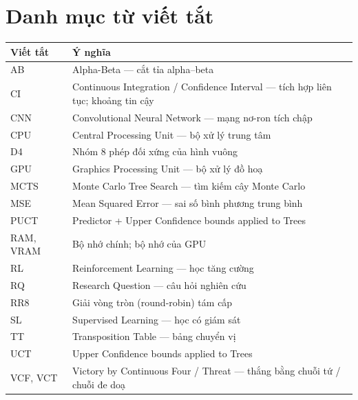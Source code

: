 \chapter*{Danh mục từ viết tắt}

\begin{table}[H]
  \centering
  \begin{tabularx}{\textwidth}{l X}
    \toprule
    \textbf{Viết tắt} & \textbf{Ý nghĩa} \\
    \midrule
    AB & Alpha-Beta --- cắt tỉa alpha--beta \\
    CI & Continuous Integration / Confidence Interval --- tích hợp liên tục; khoảng tin cậy \\
    CNN & Convolutional Neural Network --- mạng nơ-ron tích chập \\
    CPU & Central Processing Unit --- bộ xử lý trung tâm \\
    D4 & Nhóm 8 phép đối xứng của hình vuông \\
    GPU & Graphics Processing Unit --- bộ xử lý đồ hoạ \\
    MCTS & Monte Carlo Tree Search --- tìm kiếm cây Monte Carlo \\
    MSE & Mean Squared Error --- sai số bình phương trung bình \\
    PUCT & Predictor + Upper Confidence bounds applied to Trees \\
    RAM, VRAM & Bộ nhớ chính; bộ nhớ của GPU \\
    RL & Reinforcement Learning --- học tăng cường \\
    RQ & Research Question --- câu hỏi nghiên cứu \\
    RR8 & Giải vòng tròn (round-robin) tám cấp \\
    SL & Supervised Learning --- học có giám sát \\
    TT & Transposition Table --- bảng chuyển vị \\
    UCT & Upper Confidence bounds applied to Trees \\
    VCF, VCT & Victory by Continuous Four / Threat --- thắng bằng chuỗi tứ / chuỗi đe doạ \\
    \bottomrule
  \end{tabularx}
\end{table}
